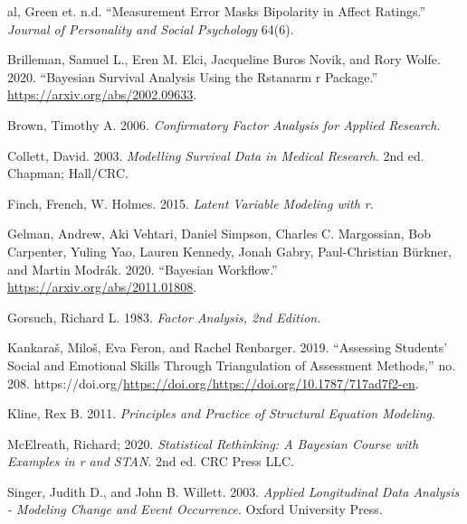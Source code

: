 \documentclass[
  letterpaper,
  DIV=11,
  numbers=noendperiod]{scrreprt}
\newlength{\cslhangindent}
\newlength{\cslentryspacingunit} %
\newenvironment{CSLReferences}[2] %
 {%
  \setlength{\parindent}{0pt}
  \ifodd #1
  \let\oldpar\par
  \def\par{\hangindent=\cslhangindent\oldpar}
  \fi
  \setlength{\parskip}{#2\cslentryspacingunit}
 }%
 {}
\begin{document}
\hypertarget{refs}{}
\begin{CSLReferences}{1}{0}
\leavevmode{}%
al, Green et. n.d. {``Measurement Error Masks Bipolarity in Affect
Ratings.''} \emph{Journal of Personality and Social Psychology} 64(6).

\leavevmode{}%
Brilleman, Samuel L., Eren M. Elci, Jacqueline Buros Novik, and Rory
Wolfe. 2020. {``Bayesian Survival Analysis Using the Rstanarm r
Package.''} \url{https://arxiv.org/abs/2002.09633}.

\leavevmode{}%
Brown, Timothy A. 2006. \emph{Confirmatory Factor Analysis for Applied
Research}.

\leavevmode{}%
Collett, David. 2003. \emph{Modelling Survival Data in Medical
Research}. 2nd ed. Chapman; Hall/CRC.

\leavevmode{}%
Finch, French, W. Holmes. 2015. \emph{Latent Variable Modeling with r}.

\leavevmode{}%
Gelman, Andrew, Aki Vehtari, Daniel Simpson, Charles C. Margossian, Bob
Carpenter, Yuling Yao, Lauren Kennedy, Jonah Gabry, Paul-Christian
Bürkner, and Martin Modrák. 2020. {``Bayesian Workflow.''}
\url{https://arxiv.org/abs/2011.01808}.

\leavevmode{}%
Gorsuch, Richard L. 1983. \emph{Factor Analysis, 2nd Edition}.

\leavevmode{}%
Kankaraš, Miloš, Eva Feron, and Rachel Renbarger. 2019. {``Assessing
Students' Social and Emotional Skills Through Triangulation of
Assessment Methods,''} no. 208.
https://doi.org/\url{https://doi.org/https://doi.org/10.1787/717ad7f2-en}.

\leavevmode{}%
Kline, Rex B. 2011. \emph{Principles and Practice of Structural Equation
Modeling}.

\leavevmode{}%
McElreath, Richard; 2020. \emph{Statistical Rethinking: A Bayesian
Course with Examples in r and STAN}. 2nd ed. CRC Press LLC.

\leavevmode{}%
Singer, Judith D., and John B. Willett. 2003. \emph{Applied Longitudinal
Data Analysis - Modeling Change and Event Occurrence}. Oxford University
Press.

\end{CSLReferences}
\end{document}
